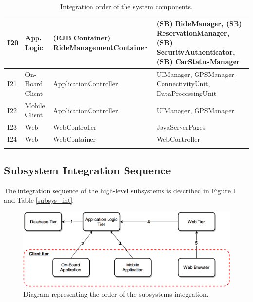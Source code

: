 \begin{longtable}{p{} | p{} | p{} | p{}}
\hline
I20 & App. Logic & (EJB Container) RideManagementContainer & (SB) RideManager, (SB) ReservationManager, (SB) SecurityAuthenticator, (SB) CarStatusManager \\
\hline
I21 & On-Board Client & ApplicationController & UIManager, GPSManager, ConnectivityUnit, DataProcessingUnit \\
\hline
I22 & Mobile Client & ApplicationController & UIManager, GPSManager \\
\hline
I23 & Web & WebController & JavaServerPages \\
\hline
I24 & Web & WebContainer & WebController \\
\hline
\caption{Integration order of the system components.}
\label{software_int}
\end{longtable}

\subsection{Subsystem Integration Sequence}
The integration sequence of the high-level subsystems is described in Figure \ref{h_level_subsys} and Table \ref{subsys_int}.

\begin{figure}[H]
\begin{center}
		\includegraphics[width=\textwidth]{./integration_strategy/diagrams/h_level_subsys.png}
		\caption{Diagram representing the order of the subsystems integration.}
		\label{h_level_subsys}
\end{center}
\end{figure}

